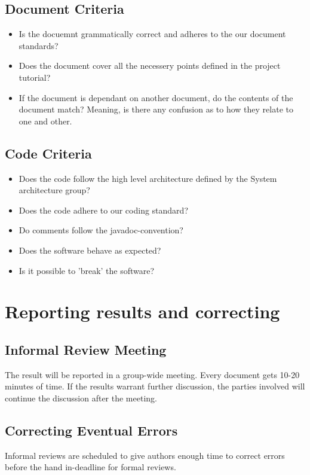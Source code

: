 \documentclass{article}
\begin{document}
    \subsection{Document Criteria}
    \begin{itemize}
        \item Is the docuemnt grammatically correct and adheres to the our document standards?
        \item Does the document cover all the necessery points defined in the project tutorial?
        \item If the document is dependant on another document, do the contents of the document match? Meaning, is there any confusion as to how they relate to one and other.
    \end{itemize}
    
    \subsection{Code Criteria}
    \begin{itemize}
        \item Does the code follow the high level architecture defined by the System architecture group?
        \item Does the code adhere to our coding standard?
        \item Do comments follow the javadoc-convention?
        \item Does the software behave as expected?
        \item Is it possible to 'break' the software?
    \end{itemize}
    
    
\newpage
\section{Reporting results and correcting}
    \subsection{Informal Review Meeting}
        The result will be reported in a group-wide meeting. Every document gets 10-20 minutes of time. If the results warrant further discussion, the parties involved will continue the discussion after the meeting.

    \subsection{Correcting Eventual Errors}
        Informal reviews are scheduled to give authors enough time to correct errors before the hand in-deadline for formal reviews.
\end{document}
